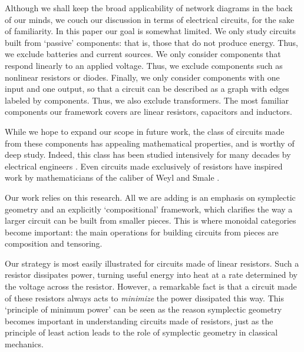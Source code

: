 Although we shall keep the broad applicability of network diagrams in the back of our minds, we couch our discussion in terms of electrical circuits, for the sake of familiarity. In this paper our goal is somewhat limited.  We only study circuits built from `passive' components: that is, those that do not produce energy.  Thus, we exclude batteries and current sources.  We only consider components that respond linearly to an applied voltage.   Thus, we exclude components such as nonlinear resistors or diodes.  Finally, we only consider components with one input and one output, so that a circuit can be described as a graph with edges labeled by components.  Thus, we also exclude transformers.  The most familiar components our framework covers are linear resistors, capacitors and inductors.

While we hope to expand our scope in future work, the class of circuits made from these components has appealing mathematical properties, and is worthy of deep study.  Indeed, this class has been studied intensively for many decades by electrical engineers \cite{AV,Budak,Slepian}.  Even circuits made exclusively of resistors have inspired work by mathematicians of the caliber of Weyl \cite{Weyl} and Smale \cite{Smale}.  

Our work relies on this research.  All we are adding is an emphasis on symplectic geometry and an explicitly `compositional' framework, which clarifies the way a larger circuit can be built from smaller pieces.  This is where monoidal categories become important: the main operations for building circuits from pieces are composition and tensoring.
 
Our strategy is most easily illustrated for circuits made of linear resistors.  Such a resistor dissipates power, turning useful energy into heat at a rate determined by the voltage across the resistor.  However, a remarkable fact is that a circuit made of these resistors always acts to \emph{minimize} the power dissipated this way.  This `principle of minimum power' can be seen as the reason symplectic geometry becomes important in understanding circuits made of resistors, just as the principle of least action leads to the role of symplectic geometry in classical mechanics.  

